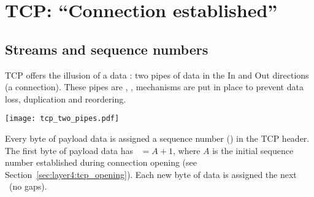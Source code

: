 \section{TCP: ``Connection established''}

\subsection{Streams and sequence numbers}

TCP offers the illusion of a data : two pipes of data in the In and Out directions 
(a  connection). These pipes are ,
\ie, mechanisms are put in place to prevent data loss, duplication and reordering.

\begin{center}
\texttt{[image: tcp\_two\_pipes.pdf]}
\end{center}

Every byte of payload data is assigned a sequence number (\nseq) in the TCP header. 
The first byte of payload
data has \nseq\ $=A+1$, where $A$ is the initial sequence number established during connection 
opening (see Section~\ref{sec:layer4:tcp_opening}). Each new byte of data is assigned the next 
\nseq\ (no gaps).

